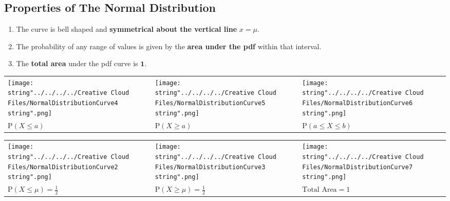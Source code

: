 \documentclass[11pt,a4paper]{book}
\begin{document}
\newpage

\subsection{Properties of The Normal Distribution}

\begin{enumerate}

\item  The curve is bell shaped and \textbf{symmetrical about the
vertical line} $x=\mu$.

\item  The probability of any range of values is given by the \textbf{area
under the pdf} within that interval.

\item  The \textbf{total area} under the pdf curve is $\textbf{1}$.

\end{enumerate}
\begin{center}
\begin{tabular}{>{\centering}p{5cm}>{\centering}p{5cm}>{\centering}p{5cm}}
\centering{}\texttt{[image: \\string"../../../../Creative Cloud Files/NormalDistributionCurve4\\string".png]} & \centering{}\texttt{[image: \\string"../../../../Creative Cloud Files/NormalDistributionCurve5\\string".png]} & \centering{}\texttt{[image: \\string"../../../../Creative Cloud Files/NormalDistributionCurve6\\string".png]}\tabularnewline
$\text{P}\left(X\leq a\right)$ & $\text{P}\left(X\geq a\right)$ & $\text{P}\left(a\leq X\leq b\right)$\tabularnewline
\end{tabular}
\par\end{center}

\begin{center}
\begin{tabular}{>{\centering}p{5cm}>{\centering}p{5cm}>{\centering}p{5cm}}
\centering{}\texttt{[image: \\string"../../../../Creative Cloud Files/NormalDistributionCurve2\\string".png]} & \centering{}\texttt{[image: \\string"../../../../Creative Cloud Files/NormalDistributionCurve3\\string".png]} & \centering{}\texttt{[image: \\string"../../../../Creative Cloud Files/NormalDistributionCurve7\\string".png]}\tabularnewline
${\displaystyle \text{P}\left(X\leq\mu\right)=\frac{1}{2}}$ & ${\displaystyle \text{P}\left(X\geq\mu\right)=\frac{1}{2}}$ & $\text{Total Area}=1$\tabularnewline
\end{tabular}
\par\end{center}
\end{document}
